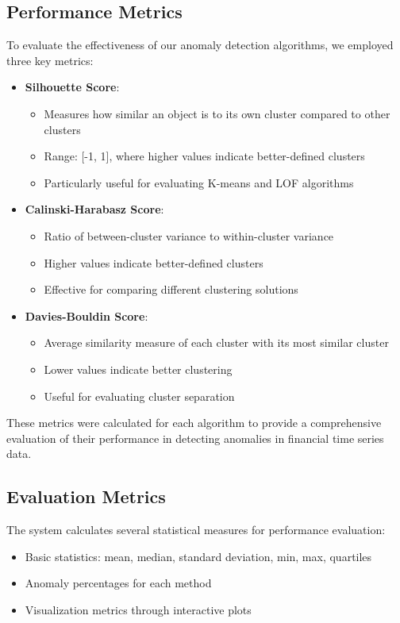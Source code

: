 \documentclass[conference]{IEEEtran}
\begin{document}
\subsection{Performance Metrics}
To evaluate the effectiveness of our anomaly detection algorithms, we employed three key metrics:

\begin{itemize}
    \item \textbf{Silhouette Score}:
    \begin{itemize}
        \item Measures how similar an object is to its own cluster compared to other clusters
        \item Range: [-1, 1], where higher values indicate better-defined clusters
        \item Particularly useful for evaluating K-means and LOF algorithms
    \end{itemize}
    
    \item \textbf{Calinski-Harabasz Score}:
    \begin{itemize}
        \item Ratio of between-cluster variance to within-cluster variance
        \item Higher values indicate better-defined clusters
        \item Effective for comparing different clustering solutions
    \end{itemize}
    
    \item \textbf{Davies-Bouldin Score}:
    \begin{itemize}
        \item Average similarity measure of each cluster with its most similar cluster
        \item Lower values indicate better clustering
        \item Useful for evaluating cluster separation
    \end{itemize}
\end{itemize}

These metrics were calculated for each algorithm to provide a comprehensive evaluation of their performance in detecting anomalies in financial time series data.

\subsection{Evaluation Metrics}
The system calculates several statistical measures for performance evaluation:
\begin{itemize}
    \item Basic statistics: mean, median, standard deviation, min, max, quartiles
    \item Anomaly percentages for each method
    \item Visualization metrics through interactive plots
\end{itemize}
\end{document}
